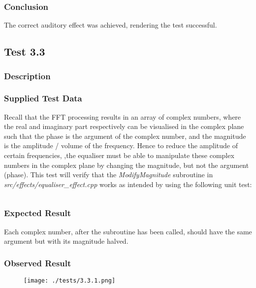 \subsubsection*{Conclusion}
The correct auditory effect was achieved, rendering the test successful.


\pagebreak
\subsection{Test 3.3}
\subsubsection*{Description}
\paragraph{}
{
	\centering
}

\subsubsection*{Supplied Test Data}
Recall that the FFT processing results in an array of complex numbers, where the real and imaginary part respectively can be visualised in the complex plane such that the phase is the argument of the complex number, and the magnitude is the amplitude / volume of the frequency. Hence to reduce the amplitude of certain frequencies, ,the equaliser must be able to manipulate these complex numbers in the complex plane by changing the magnitude, but not the argument (phase). This test will verify that the \textit{ModifyMagnitude} subroutine in \textit{src/effects/equaliser\_effect.cpp} works as intended by using the following unit test:
\inputminted[linenos,firstline=3,lastline=23]{c++}{../unit_tests/phase.cpp}

\subsubsection*{Expected Result}
Each complex number, after the subroutine has been called, should have the same argument but with its magnitude halved.

\subsubsection*{Observed Result}
\label{sec:evidence3.3}
\begin{figure}[H]
	\texttt{[image: ./tests/3.3.1.png]}
\end{figure}


